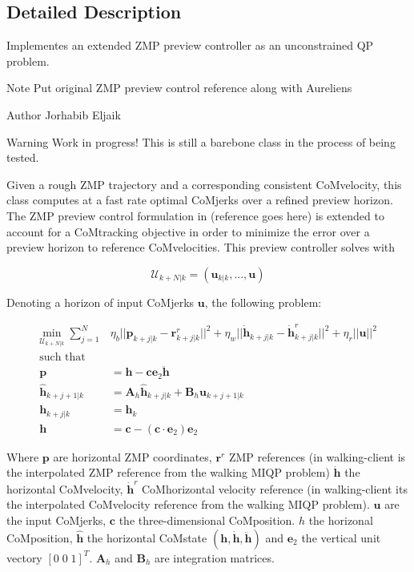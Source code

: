 \subsection{Detailed Description}
Implementes an extended Z\+MP preview controller as an unconstrained QP problem. 

\begin{DoxyNote}{Note}
Put original Z\+MP preview control reference along with Aurelien\textquotesingle{}s
\end{DoxyNote}
\begin{DoxyAuthor}{Author}
Jorhabib Eljaik
\end{DoxyAuthor}
\cite{ibanezThesis2015}

\begin{DoxyWarning}{Warning}
Work in progress! This is still a barebone class in the process of being tested.
\end{DoxyWarning}
Given a rough Z\+MP trajectory and a corresponding consistent Co\+Mvelocity, this class computes at a fast rate optimal Co\+Mjerks over a refined preview horizon. The Z\+MP preview control formulation in (reference goes here) is extended to account for a Co\+Mtracking objective in order to minimize the error over a preview horizon to reference Co\+Mvelocities. This preview controller solves with

\[ \mathcal{U}_{k+N|k} = (\mathbf{u}_{k|k}, ... , \mathbf{u}) \]

Denoting a horizon of input Co\+Mjerks $\mathbf{u}$, the following problem\+:

\begin{align*} \underset{\mathcal{U}_{k+N|k}}{\text{min}} \; \sum_{j=1}^{N} & \eta_b || \mathbf{p}_{k+j|k} - \mathbf{r}_{k+j|k}^r ||^2 + \eta_w ||\mathbf{\dot{h}}_{k+j|k} - \dot{\mathbf{h}}^r_{k+j|k} ||^2 + \eta_r || \mathbf{u} ||^2 \\ \text{such that}&\\ \mathbf{p} &= \mathbf{h} - \mathbf{c}\mathbf{e}_2 \mathbf{\ddot{h}} \\ \mathbf{\hat{h}}_{k+j+1|k} &= \mathbf{A}_h \hat{\mathbf{h}}_{k+j|k} + \mathbf{B}_h \mathbf{u}_{k+j+1|k} \\ \mathbf{h}_{k+j|k} &= \mathbf{h}_k\\ \mathbf{h} &= \mathbf{c} - (\mathbf{c}\cdot\mathbf{e}_2)\mathbf{e}_2 \end{align*}

Where $\mathbf{p}$ are horizontal Z\+MP coordinates, $ \mathbf{r}^r $ Z\+MP references (in walking-\/client is the interpolated Z\+MP reference from the walking M\+I\+QP problem) $ \mathbf{\dot{h}} $ the horizontal Co\+Mvelocity, $ \mathbf{\dot{h}}^r $ Co\+Mhorizontal velocity reference (in walking-\/client it\textquotesingle{}s the interpolated Co\+Mvelocity reference from the walking M\+I\+QP problem). $\mathbf{u}$ are the input Co\+Mjerks, $\mathbf{c}$ the three-\/dimensional Co\+Mposition. $h$ the horizonal Co\+Mposition, $\hat{\mathbf{h}}$ the horizontal Co\+Mstate $ (\mathbf{h}, \mathbf{\dot{h}}, \mathbf{\ddot{h}}) $ and $\mathbf{e}_2$ the vertical unit vectory $ [0\;0\;1]^T$. $\mathbf{A}_h$ and $\mathbf{B}_h$ are integration matrices.

